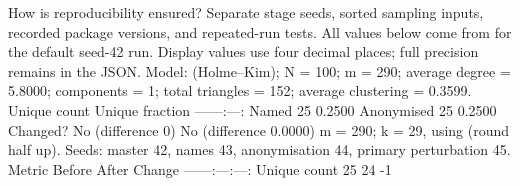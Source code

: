 {}\markdownRendererPipe{} How is reproducibility ensured? \markdownRendererPipe{} Separate stage seeds, sorted sampling inputs, recorded package versions, and repeated-run tests. \markdownRendererPipe{}\markdownRendererInterblockSeparator
{}
\markdownRendererSectionEnd \markdownRendererSectionBegin
{}\markdownRendererInterblockSeparator
{}All values below come from  for the default seed-42 run. Display values use four decimal places; full precision remains in the JSON.\markdownRendererParagraphSeparator
{} Model:  (Holme–Kim); N = 100; m = 290; average degree = 5.8000; components = 1; total triangles = 152; average clustering = 0.3599.\markdownRendererParagraphSeparator
{}\markdownRendererParagraphSeparator
{}\markdownRendererPipe{} \markdownRendererPipe{} Unique count \markdownRendererPipe{} Unique fraction \markdownRendererPipe{}\markdownRendererSoftLineBreak
{}\markdownRendererPipe{}---\markdownRendererPipe{}---:\markdownRendererPipe{}---:\markdownRendererPipe{}\markdownRendererSoftLineBreak
{}\markdownRendererPipe{} Named \markdownRendererPipe{} 25 \markdownRendererPipe{} 0.2500 \markdownRendererPipe{}\markdownRendererSoftLineBreak
{}\markdownRendererPipe{} Anonymised \markdownRendererPipe{} 25 \markdownRendererPipe{} 0.2500 \markdownRendererPipe{}\markdownRendererSoftLineBreak
{}\markdownRendererPipe{} Changed? \markdownRendererPipe{} No (difference 0) \markdownRendererPipe{} No (difference 0.0000) \markdownRendererPipe{}\markdownRendererParagraphSeparator
{} m = 290; k = 29, using  (round half up). Seeds: master 42, names 43, anonymisation 44, primary perturbation 45.\markdownRendererParagraphSeparator
{}\markdownRendererParagraphSeparator
{}\markdownRendererPipe{} Metric \markdownRendererPipe{} Before \markdownRendererPipe{} After \markdownRendererPipe{} Change \markdownRendererPipe{}\markdownRendererSoftLineBreak
{}\markdownRendererPipe{}---\markdownRendererPipe{}---:\markdownRendererPipe{}---:\markdownRendererPipe{}---:\markdownRendererPipe{}\markdownRendererSoftLineBreak
{}\markdownRendererPipe{} Unique count \markdownRendererPipe{} 25 \markdownRendererPipe{} 24 \markdownRendererPipe{} -1 \markdownRendererPipe{}\markdownRendererSoftLineBreak
